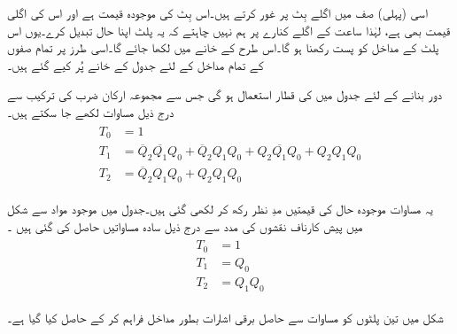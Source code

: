 اسی  (پہلی) صف میں اگلے بِٹ   پر غور کرتے ہیں۔اس بِٹ کی موجودہ قیمت  ہے  اور  اس کی اگلی قیمت بھی  ہے، لہٰذا ساعت کے اگلے کنارے پر  ہم نہیں چاہتے کہ یہ پلٹ اپنا حال تبدیل کرے۔یوں اس پلٹ کے مداخل   کو پست رکھنا ہو گا۔اس طرح   کے خانے  میں   لکھا جائے گا۔اسی طرز پر تمام صفوں کے تمام مداخل کے لئے جدول کے   خانے پُر کیے گئے ہیں۔


دور بنانے کے   لئے جدول میں  کی قطار استعمال    ہو گی جس سے مجموعہ ارکان ضرب کی ترکیب سے درج ذیل مساوات    لکھے جا سکتے ہیں۔
\begin{gather}
\begin{aligned}
T_0&=1\\
T_1&=\overline{Q}_2\overline{Q_1} Q_0+\overline{Q}_2 Q_1 Q_0+Q_2\overline{Q_1} Q_0+Q_2Q_1Q_0\\
T_2&=\overline{Q}_2 Q_1 Q_0+Q_2Q_1Q_0
\end{aligned}
\end{gather}


یہ مساوات موجودہ حال کی قیمتیں مدِ نظر رکھ کر لکھی گئی ہیں۔جدول  میں موجود مواد سے شکل   میں پیش کارناف نقشوں کی مدد سے درج ذیل  سادہ مساواتیں حاصل کی گئی ہیں ۔
\begin{gather}
\begin{aligned}\label{مساوات_گنت_کار_تین_ثنائی}
T_0&=1\\
T_1&=Q_0\\
T_2&=Q_1Q_0
\end{aligned}
\end{gather}

شکل  میں تین پلٹوں کو مساوات   سے حاصل برقی اشارات بطور مداخل فراہم  کر کے حاصل کیا گیا ہے۔

